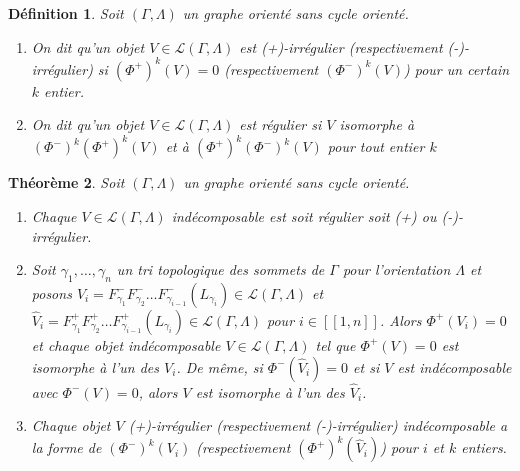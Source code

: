 \documentclass[a4paper,11pt]{article}
\newtheorem{thm}{Théorème}[section]
\newtheorem{defi}[thm]{Définition}%
\begin{document}
\begin{defi}
  Soit $(\Gamma,\Lambda)$ un graphe orienté sans cycle orienté. 
  \begin{enumerate}
  \item On dit qu'un objet $V \in \mathscr L(\Gamma,\Lambda)$ est \emph{(+)-irrégulier} (respectivement \emph{(-)-irrégulier}) si $(\Phi^{+})^{k}(V) = 0$ (respectivement $(\Phi^{-})^{k}(V)$) pour un certain $k$ entier.
  \item On dit qu'un objet $V \in \mathscr L(\Gamma,\Lambda)$ est \emph{régulier} si $V$ isomorphe à $(\Phi^{-})^{k}(\Phi^{+})^{k}(V)$ et à $(\Phi^{+})^{k}(\Phi^{-})^{k}(V)$ pour tout entier $k$
  \end{enumerate}
\end{defi}
\begin{thm}
\label{thm3}
  Soit $(\Gamma,\Lambda)$ un graphe orienté sans cycle orienté.
  \begin{enumerate}
  \item Chaque $V \in \mathscr L(\Gamma,\Lambda)$ indécomposable est soit régulier soit (+) ou (-)-irrégulier.
  \item Soit $\gamma_{1},\dots,\gamma_{n}$ un tri topologique des sommets de $\Gamma$ pour l'orientation $\Lambda$ et posons $V_{i} = F^{-}_{\gamma_{1}}F^{-}_{\gamma_{2}} \dots F^{-}_{\gamma_{i-1}}(L_{\gamma_{i}}) \in \mathscr L(\Gamma,\Lambda)$ et  $\widehat V_{i} = F^{+}_{\gamma_{1}}F^{+}_{\gamma_{2}} \dots F^{+}_{\gamma_{i-1}}(L_{\gamma_{i}}) \in \mathscr L(\Gamma,\Lambda)$ pour $i \in [\![1,n]\!]$. Alors $\Phi^{+}(V_{i})=0$ et chaque objet indécomposable $V \in \mathscr L(\Gamma,\Lambda)$ tel que $\Phi^{+}(V) =0$ est isomorphe à l'un des $V_{i}$. De même, si $\Phi^{-}(\widehat V_{i}) = 0$ et si $V$ est indécomposable avec $\Phi^{-}(V) = 0$, alors $V$ est isomorphe à l'un des $\widehat V_{i}$.
\item  Chaque objet $V$ (+)-irrégulier (respectivement (-)-irrégulier) indécomposable a la forme de $(\Phi^{-})^{k}(V_{i})$ (respectivement $(\Phi^{+})^{k}(\widehat V_{i})$) pour $i$ et $k$ entiers.
  \end{enumerate}
\end{thm}
\end{document}

